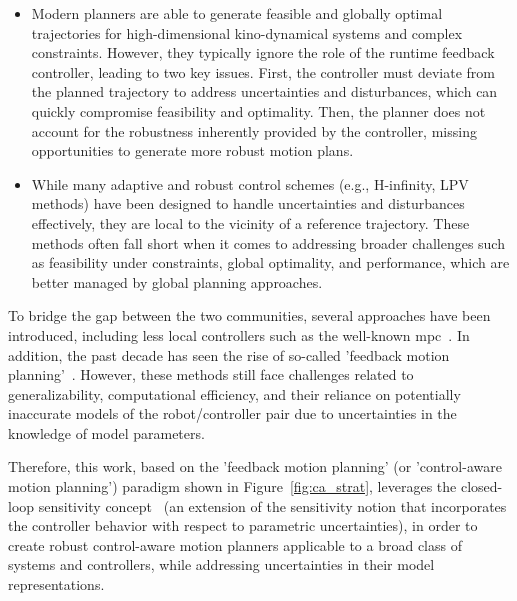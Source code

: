 \begin{itemize}
  \item Modern planners are able to generate feasible and globally optimal trajectories for high-dimensional kino-dynamical systems and complex constraints. 
  However, they typically ignore the role of the runtime feedback controller, leading to two key issues.
  First, the controller must deviate from the planned trajectory to address uncertainties and disturbances, which can quickly compromise feasibility and optimality.
  Then, the planner does not account for the robustness inherently provided by the controller, missing opportunities to generate more robust motion plans.
  \item While many adaptive and robust control schemes (e.g., H-infinity, LPV methods) have been designed to handle uncertainties and disturbances effectively, they are local to the vicinity of a reference trajectory. 
  These methods often fall short when it comes to addressing broader challenges such as feasibility under constraints, global optimality, and performance, which are better managed by global planning approaches.
\end{itemize}
    
To bridge the gap between the two communities, several approaches have been introduced, including less local controllers such as the well-known \gls{mpc}~\cite{cTMPC}. 
In addition, the past decade has seen the rise of so-called 'feedback motion planning'~\cite{cTognon, cContractThMP, cMajundarLibrary}. 
However, these methods still face challenges related to generalizability, computational efficiency, and their reliance on potentially inaccurate models of the robot/controller pair due to uncertainties in the knowledge of model parameters.

Therefore, this work, based on the 'feedback motion planning' (or 'control-aware motion planning') paradigm shown in Figure~\ref{fig:ca_strat}, leverages the closed-loop sensitivity concept~\cite{cPi,cTh} (an extension of the sensitivity notion that incorporates the controller behavior with respect to parametric uncertainties), in order to create robust control-aware motion planners applicable to a broad class of systems and controllers, while addressing uncertainties in their model representations.

